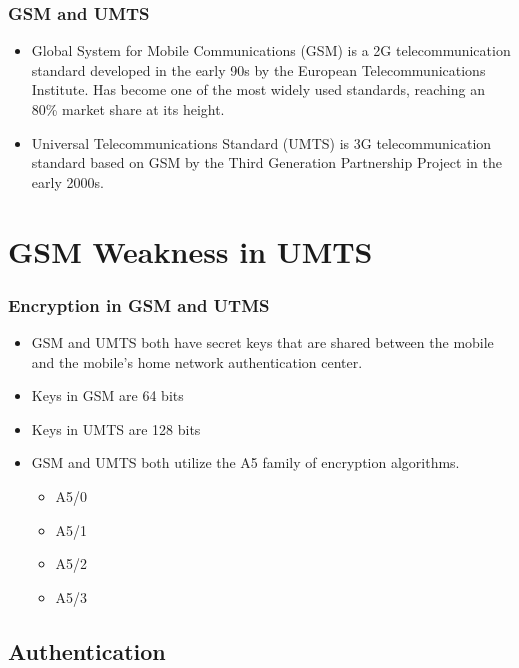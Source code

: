 \documentclass{beamer}
\begin{document}
		\begin{frame}
		\frametitle{GSM and UMTS}
		\begin{itemize}
		\item Global System for Mobile Communications (GSM) is a 2G telecommunication standard developed in the early 90s by the European Telecommunications Institute. Has become one of the most widely used standards, reaching an 80\% market share at its height.
					
		
		\item Universal Telecommunications Standard (UMTS) is 3G telecommunication standard based on GSM by the Third Generation Partnership Project in the early 2000s.   
		\end{itemize}
	\end{frame}

	
\section{GSM Weakness in UMTS}

	

	\begin{frame}
	\frametitle{Encryption in GSM and UTMS}
	\begin{itemize}
	
	
		\item GSM and UMTS both have secret keys that are shared between the mobile and the mobile's home network authentication center.
		\item Keys in GSM are 64 bits
		\item Keys in UMTS are 128 bits
		
		\item GSM and UMTS both utilize the A5 family of encryption algorithms. 
		 \begin{itemize}
			\item A5/0 
			\item A5/1
			\item A5/2
			\item A5/3 
		\end{itemize}
		\end{itemize}
	\end{frame}
	
\subsection{Authentication}
\end{document}

